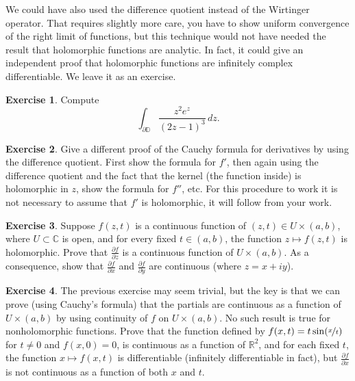 \documentclass[12pt,openany]{book}
\newcommand{\C}{{\mathbb{C}}}
\newcommand{\R}{{\mathbb{R}}}
\newcommand{\D}{{\mathbb{D}}}
\theoremstyle{plain}
\theoremstyle{remark}
\theoremstyle{definition}
\newenvironment{exbox}{%
    \def\FrameCommand{\vrule width 1pt \relax\hspace{10pt}}%
    \MakeFramed{\advance\hsize-\width\FrameRestore}%
}{%
    \endMakeFramed
}
\theoremstyle{exercise}
\newtheorem{exercise}{Exercise}[section]
\theoremstyle{example}
\begin{document}
We could have also used the difference quotient instead of the
Wirtinger operator.  That requires slightly more care, you have to show
uniform convergence of the right limit of functions, but this technique
would not have needed the result
that holomorphic functions are analytic.  In fact,
it could give an independent proof that holomorphic functions are infinitely
complex differentiable.
We leave it as an exercise.

\begin{exbox}
\begin{exercise}
Compute
\begin{equation*}
\int_{\partial \D}
\frac{z^2 e^z}{(2z-1)^3} \, dz .
\end{equation*}
\end{exercise}

\begin{exercise}
Give a different proof of the Cauchy formula for derivatives by using the difference
quotient.  First show the formula for $f'$, then again using the difference
quotient and the fact that the kernel (the function inside) is holomorphic
in $z$, show the formula for $f''$, etc.  For this procedure to work it is
not necessary to assume that $f'$ is holomorphic, it will follow from your
work.
\end{exercise}

\begin{exercise}%
\label{exercise:partialderscont}
Suppose $f(z,t)$ is a continuous function of $(z,t) \in U \times (a,b)$,
where $U \subset \C$ is open, and for every fixed $t \in (a,b)$, the function
$z \mapsto f(z,t)$ is holomorphic.  Prove that
$\frac{\partial f}{\partial z}$ is a continuous function of $U \times
(a,b)$.  As a consequence, show that
$\frac{\partial f}{\partial x}$
and
$\frac{\partial f}{\partial y}$ are continuous (where $z=x+iy$).
\end{exercise}

\begin{exercise}
The previous exercise may seem trivial, but the key is that we can prove
(using Cauchy's formula) that the partials are continuous as a function of
$U \times (a,b)$ by using continuity of $f$ on $U \times (a,b)$.  No such
result is true for nonholomorphic functions.  Prove that the function defined by
$f(x,t) = t \sin(\nicefrac{x}{t})$ for $t \not= 0$ and $f(x,0) =  0$,
is continuous as a function of $\R^2$, and for each fixed $t$, the function
$x \mapsto f(x,t)$ is differentiable (infinitely differentiable in fact),
but $\frac{\partial f}{\partial x}$ is not continuous as a function of both
$x$ and $t$.
\end{exercise}
\end{exbox}
\end{document}
